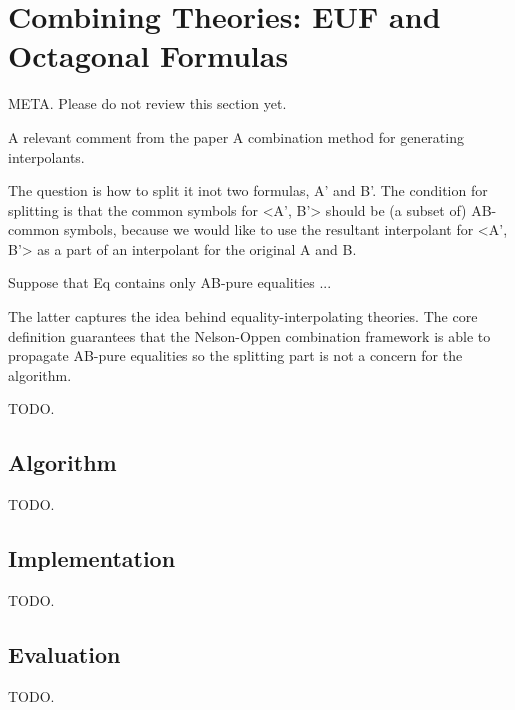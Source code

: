 \chapter{Combining Theories: EUF and Octagonal Formulas}

META. Please do not review this section yet.

A relevant comment from the paper A combination method for generating interpolants.

The question is how to split it inot two formulas, A' and B'. The condition for splitting is that
the common symbols for <A', B'> should be (a subset of) AB-common symbols, because we would like
to use the resultant interpolant for <A', B'> as a part of an interpolant
for the original A and B.

  Suppose that Eq contains only AB-pure equalities ...

  The latter captures the idea behind equality-interpolating theories. The core definition guarantees 
  that the Nelson-Oppen combination framework is able to propagate  
  AB-pure equalities so the splitting part is not a concern for the algorithm.

TODO.

\section{Algorithm}
 
TODO.

\section{Implementation}

TODO.

\section{Evaluation}
TODO.

